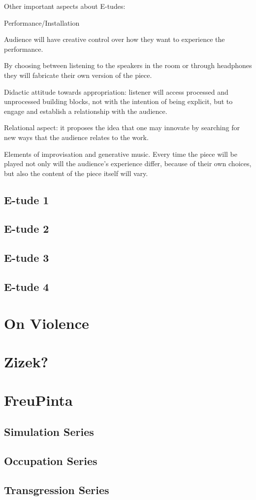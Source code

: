 Other important aspects about E-tudes:

Performance/Installation 

Audience will have creative control over how they want to experience the performance.

By choosing between listening to the speakers in the room or through headphones they will fabricate their own version of the piece.

Didactic attitude towards appropriation: listener will access processed and unprocessed building blocks, not with the intention of being explicit, but to engage and establish a relationship with the audience.

Relational aspect: it proposes the idea that one may innovate by searching for new ways that the audience relates to the work.

Elements of improvisation and generative music. Every time the piece will be played not only will the audience’s experience differ, because of their own choices, but also the content of the piece itself will vary.

	
\subsection{E-tude 1}
\subsection{E-tude 2}
\subsection{E-tude 3}
\subsection{E-tude 4}

\section{On Violence}

\section{Zizek?}

\section{FreuPinta}

\subsection{Simulation Series}
\subsection{Occupation Series}
\subsection{Transgression Series}

\label{ch:compositions}